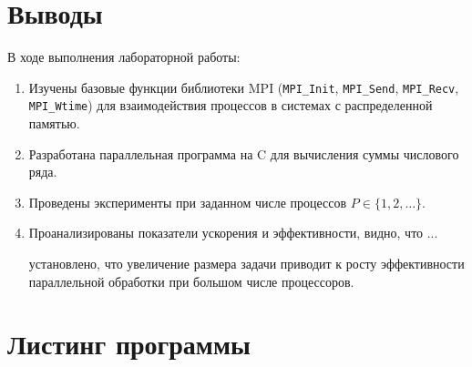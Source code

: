 	\section*{Выводы}
	В ходе выполнения лабораторной работы:
	\begin{enumerate}
		\item Изучены базовые функции библиотеки MPI (\texttt{MPI\_Init}, \texttt{MPI\_Send}, \texttt{MPI\_Recv}, \texttt{MPI\_Wtime}) для взаимодействия процессов в системах с распределенной памятью.
		\item Разработана параллельная программа на C для вычисления суммы числового ряда.
		\item Проведены эксперименты при заданном числе процессов $P \in \{ 1, 2, \ldots \}$.
		\item Проанализированы показатели ускорения и эффективности, видно, что ... 
		
		установлено, что увеличение размера задачи приводит к росту эффективности параллельной обработки при большом числе процессоров.
	\end{enumerate}
	
	\newpage
	\section*{Листинг программы}
	
